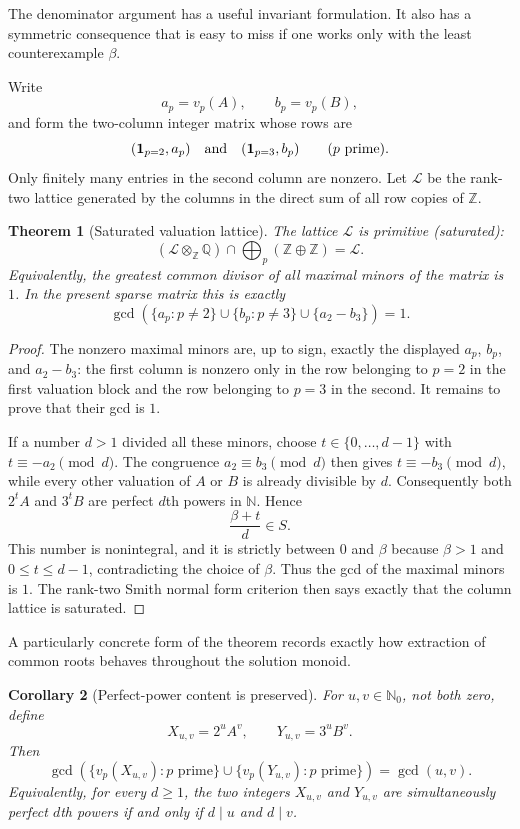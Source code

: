 \documentclass[11pt,oneside]{article}
\newtheorem{theorem}{Theorem}[section]
\newtheorem{corollary}[theorem]{Corollary}
\theoremstyle{definition}
\theoremstyle{remark}
\begin{document}
The denominator argument has a useful invariant formulation.  It also has a
symmetric consequence that is easy to miss if one works only with the least
counterexample $\beta$.

Write
\[
 a_p=v_p(A),\qquad b_p=v_p(B),
\]
and form the two-column integer matrix whose rows are
\[
  (\mathbf 1_{p=2},a_p)
  \quad\hbox{and}\quad
  (\mathbf 1_{p=3},b_p)
  \qquad (p\text{ prime}).
\]
Only finitely many entries in the second column are nonzero.  Let
$\mathcal L$ be the rank-two lattice generated by the columns in the direct
sum of all row copies of $\mathbb Z$.

\begin{theorem}[Saturated valuation lattice]
\label{thm:saturated-valuation-lattice}
The lattice $\mathcal L$ is primitive (saturated):
\[
  (\mathcal L\otimes_{\mathbb Z}\mathbb Q)
  \cap\bigoplus_p(\mathbb Z\oplus\mathbb Z)=\mathcal L.
\]
Equivalently, the greatest common divisor of all maximal minors of the matrix
is $1$.  In the present sparse matrix this is exactly
\[
 \gcd\!\left(
   \{a_p:p\ne2\}\cup
   \{b_p:p\ne3\}\cup
   \{a_2-b_3\}
 \right)=1.
\]
\end{theorem}

\begin{proof}
The nonzero maximal minors are, up to sign, exactly the displayed $a_p$,
$b_p$, and $a_2-b_3$: the first column is nonzero only in the row belonging to
$p=2$ in the first valuation block and the row belonging to $p=3$ in the
second.  It remains to prove that their gcd is $1$.

If a number $d>1$ divided all these minors, choose
$t\in\{0,\ldots,d-1\}$ with $t\equiv-a_2\pmod d$.  The congruence
$a_2\equiv b_3\pmod d$ then gives $t\equiv-b_3\pmod d$, while every other
valuation of $A$ or $B$ is already divisible by $d$.  Consequently both
$2^tA$ and $3^tB$ are perfect $d$th powers in $\mathbb N$.  Hence
\[
  \frac{\beta+t}{d}\in S.
\]
This number is nonintegral, and it is strictly between $0$ and $\beta$ because
$\beta>1$ and $0\le t\le d-1$, contradicting the choice of $\beta$.  Thus the
gcd of the maximal minors is $1$.  The rank-two Smith normal form criterion
then says exactly that the column lattice is saturated.
\end{proof}

A particularly concrete form of the theorem records exactly how extraction of
common roots behaves throughout the solution monoid.

\begin{corollary}[Perfect-power content is preserved]
\label{cor:perfect-power-content}
For $u,v\in\mathbb N_0$, not both zero, define
\[
 X_{u,v}=2^uA^v,\qquad Y_{u,v}=3^uB^v.
\]
Then
\[
 \gcd\!\left(
   \{v_p(X_{u,v}):p\text{ prime}\}
   \cup
   \{v_p(Y_{u,v}):p\text{ prime}\}
 \right)=\gcd(u,v).
\]
Equivalently, for every $d\ge1$, the two integers $X_{u,v}$ and $Y_{u,v}$
are simultaneously perfect $d$th powers if and only if
$d\mid u$ and $d\mid v$.
\end{corollary}
\end{document}
